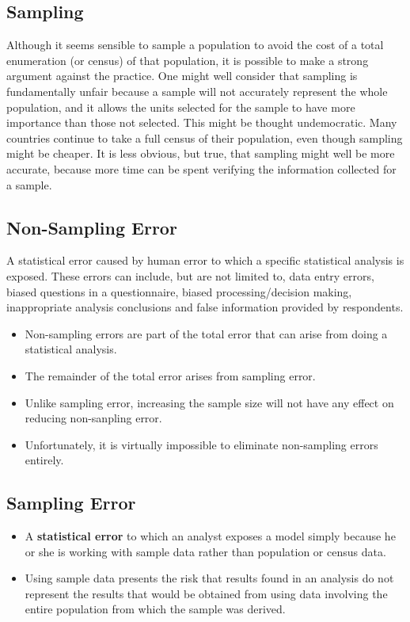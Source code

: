 ﻿\documentclass[]{report}
\begin{document}
\subsection{Sampling}
Although it seems sensible to sample a population to avoid the cost of a total enumeration (or
census) of that population, it is possible to make a strong argument against the practice. One might
well consider that sampling is fundamentally unfair because a sample will not accurately represent
the whole population, and it allows the units selected for the sample to have more importance
than those not selected. This might be thought undemocratic. Many countries continue to take
a full census of their population, even though sampling might be cheaper. It is less obvious, but
true, that sampling might well be more accurate, because more time can be spent verifying the
information collected for a sample.



\subsection{Non-Sampling Error}

A statistical error caused by human error to which a specific statistical analysis is exposed. These errors can include, but are not limited to, data entry errors, biased questions in a questionnaire, biased processing/decision making, inappropriate analysis conclusions and false information provided by respondents.




\begin{itemize}
\item 
Non-sampling errors are part of the total error that can arise from doing a statistical analysis. 
\item The remainder of the total error arises from sampling error. 
\item Unlike sampling error, increasing the sample size will not have any effect on reducing non-sanpling error.
\item Unfortunately, it is virtually impossible to eliminate non-sampling errors entirely. 
\end{itemize}



\subsection{Sampling Error}

\begin{itemize}
\item A \textbf{statistical error} to which an analyst exposes a model simply because he or she is working with sample data rather than population or census data.
\item Using sample data presents the risk that results found in an analysis do not represent the results that would be 
obtained from using data involving the entire population from which the sample was derived.
\end{itemize}
\end{document}
